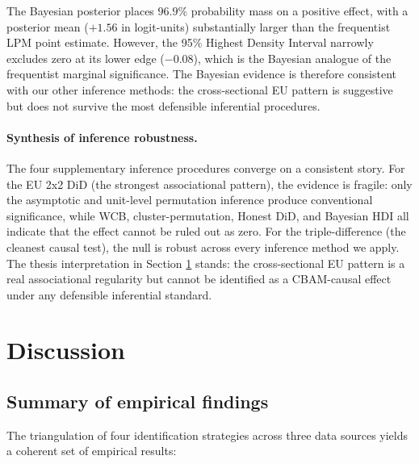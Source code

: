 \documentclass[11pt,a4paper]{article}
\begin{document}
The Bayesian posterior places $96.9\%$ probability mass on a positive effect, with a posterior mean ($+1.56$ in logit-units) substantially larger than the frequentist LPM point estimate. However, the 95\% Highest Density Interval narrowly excludes zero at its lower edge ($-0.08$), which is the Bayesian analogue of the frequentist marginal significance. The Bayesian evidence is therefore consistent with our other inference methods: the cross-sectional EU pattern is suggestive but does not survive the most defensible inferential procedures.

\paragraph{Synthesis of inference robustness.} The four supplementary inference procedures converge on a consistent story. For the EU 2x2 DiD (the strongest associational pattern), the evidence is fragile: only the asymptotic and unit-level permutation inference produce conventional significance, while WCB, cluster-permutation, Honest DiD, and Bayesian HDI all indicate that the effect cannot be ruled out as zero. For the triple-difference (the cleanest causal test), the null is robust across every inference method we apply. The thesis interpretation in Section \ref{sec:ch8-discussion} stands: the cross-sectional EU pattern is a real associational regularity but cannot be identified as a CBAM-causal effect under any defensible inferential standard.


\section{Discussion}
\label{sec:ch8-discussion}

\subsection{Summary of empirical findings}

The triangulation of four identification strategies across three data sources yields a coherent set of empirical results:
\end{document}
